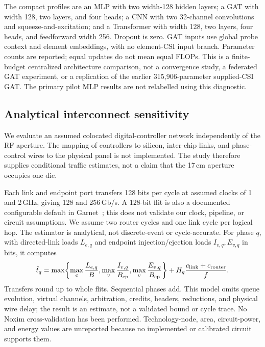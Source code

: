 \documentclass[journal]{IEEEtran}
\begin{document}
The compact profiles are an MLP with two width-128 hidden layers; a GAT with width 128, two layers, and four heads; a CNN with two 32-channel convolutions and squeeze-and-excitation; and a Transformer with width 128, two layers, four heads, and feedforward width 256. Dropout is zero. GAT inputs use global probe context and element embeddings, with no element-CSI input branch. Parameter counts are reported; equal updates do not mean equal FLOPs. This is a finite-budget centralized architecture comparison, not a convergence study, a federated GAT experiment, or a replication of the earlier 315,906-parameter supplied-CSI GAT. The primary pilot MLP results are not relabelled using this diagnostic.


\subsection{Analytical interconnect sensitivity}
We evaluate an assumed colocated digital-controller network independently of the RF aperture. The mapping of controllers to silicon, inter-chip links, and phase-control wires to the physical panel is not implemented. The study therefore supplies conditional traffic estimates, not a claim that the 17\,cm aperture occupies one die.

Each link and endpoint port transfers 128 bits per cycle at assumed clocks of 1 and 2\,GHz, giving 128 and 256\,Gb/s. A 128-bit flit is also a documented configurable default in Garnet~\cite{garnet}; this does not validate our clock, pipeline, or circuit assumptions. We assume two router cycles and one link cycle per logical hop. The estimator is analytical, not discrete-event or cycle-accurate. For phase $q$, with directed-link loads $L_{e,q}$ and endpoint injection/ejection loads $I_{v,q},E_{v,q}$ in bits, it computes
\begin{equation}
 \hat t_q=\max\!\left\{\max_e\frac{L_{e,q}}{B},
 \max_v\frac{I_{v,q}}{B_{\rm ep}},\max_v\frac{E_{v,q}}{B_{\rm ep}}\right\}
 +H_q\frac{c_{\rm link}+c_{\rm router}}{f}.
\end{equation}
Transfers round up to whole flits. Sequential phases add. This model omits queue evolution, virtual channels, arbitration, credits, headers, reductions, and physical wire delay; the result is an estimate, not a validated bound or cycle trace. No Noxim cross-validation has been performed. Technology-node, area, circuit-power, and energy values are unreported because no implemented or calibrated circuit supports them.
\end{document}
